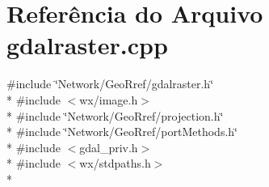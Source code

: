 \section{Referência do Arquivo gdalraster.\+cpp}
\label{gdalraster_8cpp}
{\ttfamily \#include \char`\"{}Network/\+Geo\+Rref/gdalraster.\+h\char`\"{}}\\*
{\ttfamily \#include $<$wx/image.\+h$>$}\\*
{\ttfamily \#include \char`\"{}Network/\+Geo\+Rref/projection.\+h\char`\"{}}\\*
{\ttfamily \#include \char`\"{}Network/\+Geo\+Rref/port\+Methods.\+h\char`\"{}}\\*
{\ttfamily \#include $<$gdal\+\_\+priv.\+h$>$}\\*
{\ttfamily \#include $<$wx/stdpaths.\+h$>$}\\*
